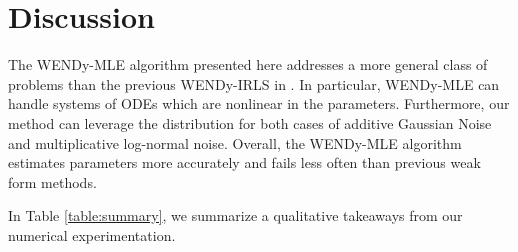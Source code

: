 \section{Discussion}\label{sec:discussion}

The WENDy-MLE algorithm presented here addresses a more general class of problems than the previous WENDy-IRLS in \cite{BortzMessengerDukic2023BullMathBiol}. In particular, WENDy-MLE can handle systems of ODEs which are nonlinear in the parameters. Furthermore, our method can leverage the distribution for both cases of additive Gaussian Noise and multiplicative log-normal noise. Overall, the WENDy-MLE algorithm estimates parameters more accurately and fails less often than previous weak form methods. 

In Table \ref{table:summary}, we summarize a qualitative takeaways from our numerical experimentation. 
\renewcommand*\arraystretch{1.75}
\begin{table}[H]
	\caption{Here we provide high-level advice on the performance of the discussed methods applied to different classes of problems. We compare OE-LS, solving ordinary least squares for the weak residual (W-LS), WENDy-IRLS, and  WENDy-MLE. A double check \checkmark\checkmark\, indicates the algorithm excels under most circumstances in our testing. A single \checkmark\, suggests that the algorithm can work, but requires oversight due to a reduced domain of convergence for initial parameter estimates as well as other numerical discretization challenges. An \xmark\, indicates that the algorithm is not suited to the problem (e.g., W-LS and WENDy-IRLS only work for linear-in-parameter ODEs and without correction, noisy data will incur bias for W-LS).}\label{table:summary}
\end{table}

